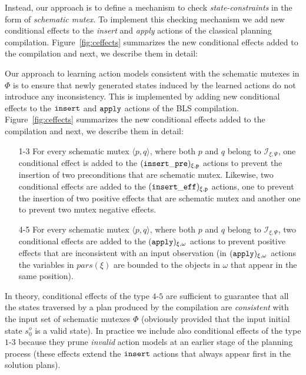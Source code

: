 \documentclass[letterpaper]{article} %
\newcommand{\tup}[1]{{\langle #1 \rangle}}
\begin{document}
Instead, our approach is to define a mechanism to check {\em state-constraints} in the form of {\em schematic mutex}. To implement this checking mechanism we add new conditional effects to the {\em insert} and {\em apply} actions of the classical planning compilation. Figure~\ref{fig:ceffects} summarizes the new conditional effects added to the compilation and next, we describe them in detail:

Our approach to learning action models consistent with the schematic mutexes in $\Phi$ is to ensure that newly generated states induced by the learned actions do not introduce any inconsistency. This is implemented by adding new conditional effects to the ${\tt \small insert}$ and ${\tt\small apply}$ actions of the BLS compilation. Figure~\ref{fig:ceffects} summarizes the new conditional effects added to the compilation and next, we describe them in detail:

\begin{enumerate}
	\item[1-3] For every schematic mutex $\tup{p,q}$, where both $p$ and $q$ belong to ${\mathcal I}_{\xi,\Psi}$, one conditional effect is added to the ${\tt \small (insert\_pre)_{\xi,p}}$ actions to prevent the insertion of two preconditions that are schematic mutex. Likewise, two conditional effects are added to the ${\tt \small (insert\_eff)_{\xi,p}}$ actions, one to prevent the insertion of two positive effects that are schematic mutex and another one to prevent two mutex negative effects.
	\item[4-5] For every schematic mutex $\tup{p,q}$, where both $p$ and $q$ belong to ${\mathcal I}_{\xi,\Psi}$, two conditional effects are added to the ${\tt \small (apply)_{\xi,\omega}}$ actions to prevent positive effects that are inconsistent with an input observation (in ${\tt \small (apply)_{\xi,\omega}}$ actions the variables in $pars(\xi)$ are bounded to the objects in $\omega$ that appear in the same position).
\end{enumerate}

In theory, conditional effects of the type $4$-$5$ are sufficient to guarantee that all the states traversed by a plan produced by the compilation are {\em consistent} with the input set of schematic mutexes $\Phi$ (obviously provided that the input initial state $s_0^o$ is a valid state). In practice we include also conditional effects of the type $1$-$3$ because they prune {\em invalid} action models at an earlier stage of the planning process (these effects extend the ${\tt \small insert}$ actions that always appear first in the solution plans).
\end{document}
